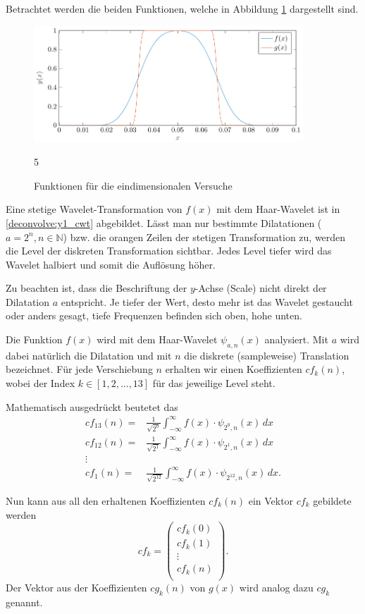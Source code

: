 Betrachtet werden die beiden Funktionen, welche in Abbildung \ref{deconvolve:1d} dargestellt sind.
\begin{figure}[h]
\centering
\includegraphics[width=0.9\textwidth]{./papers/deconvolve/pictures/1d.pdf}
\caption{Funktionen für die eindimensionalen Versuche\label{deconvolve:1d}}5
\end{figure}
Eine stetige Wavelet-Transformation von $f(x)$ mit dem Haar-Wavelet ist in \ref{deconvolve:y1_cwt} abgebildet.
Lässt man nur bestimmte Dilatationen ($a=2^n, n\in \mathbb{N}$) bzw. die orangen \glqq Zeilen\grqq{} der stetigen Transformation zu, werden die Level der diskreten Transformation sichtbar.
Jedes Level tiefer wird das Wavelet \glqq halbiert\grqq{} und somit die Auflösung höher.

Zu beachten ist, dass die Beschriftung der $y$-Achse (Scale) nicht direkt der Dilatation $a$ entspricht.
Je tiefer der Wert, desto mehr ist das Wavelet gestaucht oder anders gesagt, tiefe Frequenzen befinden sich oben, hohe unten.

Die Funktion $f(x)$ wird mit dem Haar-Wavelet $\psi_{a,n}(x)$ analysiert.
Mit $a$ wird dabei natürlich die Dilatation und mit $n$ die diskrete (sampleweise) Translation bezeichnet.
Für jede Verschiebung $n$ erhalten wir einen Koeffizienten $cf_k(n)$, wobei der Index $k\in[1,2,...,13]$ für das jeweilige Level steht. 

Mathematisch ausgedrückt beutetet das
\begin{align*}
	cf_{13}(n) =& \frac{1}{\sqrt{2^0}}\int_{-\infty}^{\infty}f(x)\cdot\psi_{2^0, n}(x)\,dx\\
	cf_{12}(n) =& \frac{1}{\sqrt{2^1}}\int_{-\infty}^{\infty}f(x)\cdot\psi_{2^1, n}(x)\,dx\\
	\vdots\\
	cf_{1}(n) =& \frac{1}{\sqrt{2^{12}}}\int_{-\infty}^{\infty}f(x)\cdot\psi_{2^{12}, n}(x)\,dx.
\end{align*}

Nun kann aus all den erhaltenen Koeffizienten $cf_k(n)$ ein Vektor $cf_k$ gebildete werden
$$cf_k = \left(\begin{array}{c}
	cf_k(0)\\
	cf_k(1)\\
	\vdots\\
	cf_k(n)\\
\end{array}\right).$$
Der Vektor aus der Koeffizienten $cg_k(n)$ von $g(x)$ wird analog dazu $cg_k$ genannt.

